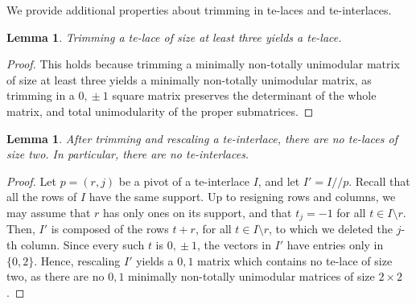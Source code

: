 \documentclass[11pt,a4paper]{amsart}
\theoremstyle{plain}
\newtheorem{lemma}[theorem]{Lemma}
\theoremstyle{definition}
\begin{document}
We provide additional properties about trimming in te-laces and te-interlaces.
\begin{lemma}\label{pivotte-knot}
Trimming a te-lace of size at least three yields a te-lace.
\end{lemma}
\begin{proof}
This holds because trimming a minimally non-totally unimodular matrix of size at least three yields a minimally non-totally unimodular matrix, as trimming in a $0,\!\pm1$ square matrix preserves the determinant of the whole matrix, and total unimodularity of the proper submatrices.
\end{proof}

\begin{lemma}\label{lemma:trimming_te-interlaces}
After trimming and rescaling a te-interlace, there are no te-laces of size two. In particular, there are no te-interlaces.
\end{lemma}

\begin{proof}
Let $p=(r,j)$ be a pivot of a te-interlace $I$, and let $I'=I/\!\!/p$.
Recall that all the rows of $I$ have the same support.
Up to resigning rows and columns, we may assume that $r$ has only ones on its support, and that $t_j=-1$ for all $t\in I\setminus r$.
Then, $I'$ is composed of the rows $t+r$, for all $t\in I\setminus r$, to which we deleted the $j$-th column.
Since every such $t$ is $0,\!\pm1$, the vectors in $I'$ have entries only in $\{0,2\}$.
Hence, rescaling $I'$ yields a $0,\!1$ matrix which contains no te-lace of size two, as there are no $0,\!1$ minimally non-totally unimodular matrices of size $2\times 2$.
\end{proof}
\end{document}
